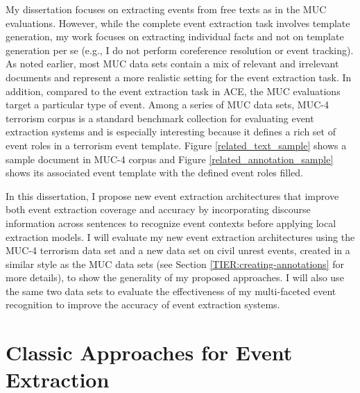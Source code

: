 My dissertation focuses on extracting events from free texts 
as in the MUC evaluations. 
However, while the complete event extraction task involves template
 generation, my work focuses on
 extracting individual facts and not on template generation per se
 (e.g., I do not perform coreference resolution or event
 tracking).
As noted earlier, most MUC data sets contain a mix of relevant 
and irrelevant documents and represent a more realistic 
setting for the event extraction task. 
In addition, compared to the event extraction task in ACE, 
the MUC evaluations target a particular type of event.
Among a series of MUC data sets, 
MUC-4 terrorism corpus \cite{muc4-proceedings} 
is a standard benchmark collection 
for evaluating event extraction systems and is 
especially interesting because 
it defines a rich set of event roles in a terrorism event template. 
Figure \ref{related_text_sample} shows a sample 
document in MUC-4 corpus and Figure \ref{related_annotation_sample} 
shows its associated event template with 
the defined event roles filled.  


In this dissertation, I propose 
new event extraction architectures that improve 
both event extraction coverage and accuracy by
incorporating discourse information across sentences 
to recognize event contexts before applying local extraction models.
I will evaluate my new event extraction architectures 
using the MUC-4 terrorism data set and a  
new data set on civil unrest events, created 
in a similar style as the MUC 
data sets
(see Section \ref{TIER:creating-annotations} for more details), 
to show the generality of my proposed approaches. 
I will also use the same two data sets to evaluate the effectiveness of my 
multi-faceted event recognition to improve the accuracy of 
event extraction systems. 


\section{Classic Approaches for Event Extraction}

